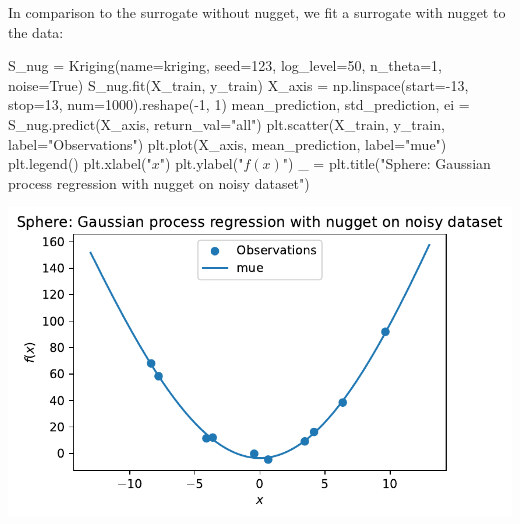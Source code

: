 \documentclass[
  letterpaper,
  DIV=11,
  numbers=noendperiod]{scrreprt}
\newenvironment{Shaded}{\begin{snugshade}}{\end{snugshade}}
\newcommand{\DecValTok}[1]{\textcolor[rgb]{0.68,0.00,0.00}{#1}}
\newcommand{\NormalTok}[1]{\textcolor[rgb]{0.00,0.23,0.31}{#1}}
\newcommand{\OperatorTok}[1]{\textcolor[rgb]{0.37,0.37,0.37}{#1}}
\newcommand{\StringTok}[1]{\textcolor[rgb]{0.13,0.47,0.30}{#1}}
\newcommand{\VariableTok}[1]{\textcolor[rgb]{0.07,0.07,0.07}{#1}}
\begin{document}
In comparison to the surrogate without nugget, we fit a surrogate with
nugget to the data:

\begin{Shaded}
\begin{Highlighting}[]
\NormalTok{S\_nug }\OperatorTok{=}\NormalTok{ Kriging(name}\OperatorTok{=}\StringTok{\textquotesingle{}kriging\textquotesingle{}}\NormalTok{,}
\NormalTok{            seed}\OperatorTok{=}\DecValTok{123}\NormalTok{,}
\NormalTok{            log\_level}\OperatorTok{=}\DecValTok{50}\NormalTok{,}
\NormalTok{            n\_theta}\OperatorTok{=}\DecValTok{1}\NormalTok{,}
\NormalTok{            noise}\OperatorTok{=}\VariableTok{True}\NormalTok{)}
\NormalTok{S\_nug.fit(X\_train, y\_train)}
\NormalTok{X\_axis }\OperatorTok{=}\NormalTok{ np.linspace(start}\OperatorTok{={-}}\DecValTok{13}\NormalTok{, stop}\OperatorTok{=}\DecValTok{13}\NormalTok{, num}\OperatorTok{=}\DecValTok{1000}\NormalTok{).reshape(}\OperatorTok{{-}}\DecValTok{1}\NormalTok{, }\DecValTok{1}\NormalTok{)}
\NormalTok{mean\_prediction, std\_prediction, ei }\OperatorTok{=}\NormalTok{ S\_nug.predict(X\_axis, return\_val}\OperatorTok{=}\StringTok{"all"}\NormalTok{)}
\NormalTok{plt.scatter(X\_train, y\_train, label}\OperatorTok{=}\StringTok{"Observations"}\NormalTok{)}
\NormalTok{plt.plot(X\_axis, mean\_prediction, label}\OperatorTok{=}\StringTok{"mue"}\NormalTok{)}
\NormalTok{plt.legend()}
\NormalTok{plt.xlabel(}\StringTok{"$x$"}\NormalTok{)}
\NormalTok{plt.ylabel(}\StringTok{"$f(x)$"}\NormalTok{)}
\NormalTok{\_ }\OperatorTok{=}\NormalTok{ plt.title(}\StringTok{"Sphere: Gaussian process regression with nugget on noisy dataset"}\NormalTok{)}
\end{Highlighting}
\end{Shaded}

\includegraphics{014_num_spot_ocba_files/figure-pdf/cell-11-output-1.pdf}
\end{document}
